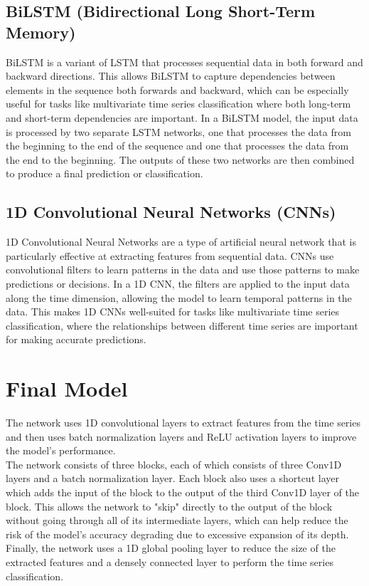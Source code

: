 \documentclass[11pt, oneside]{article}
\begin{document}
\subsection{BiLSTM (Bidirectional Long Short-Term Memory)}
BiLSTM is a variant of LSTM that processes sequential data in both forward and backward directions. This allows BiLSTM to capture dependencies between elements in the sequence both forwards and backward, which can be especially useful for tasks like multivariate time series classification where both long-term and short-term dependencies are important. In a BiLSTM model, the input data is processed by two separate LSTM networks, one that processes the data from the beginning to the end of the sequence and one that processes the data from the end to the beginning. The outputs of these two networks are then combined to produce a final prediction or classification.
\subsection{1D Convolutional Neural Networks (CNNs)}
1D Convolutional Neural Networks are a type of artificial neural network that is particularly effective at extracting features from sequential data. CNNs use convolutional filters to learn patterns in the data and use those patterns to make predictions or decisions. In a 1D CNN, the filters are applied to the input data along the time dimension, allowing the model to learn temporal patterns in the data. This makes 1D CNNs well-suited for tasks like multivariate time series classification, where the relationships between different time series are important for making accurate predictions.
\section{Final Model}
The network uses 1D convolutional layers to extract features from the time series and then uses batch normalization layers and ReLU activation layers to improve the model's performance.\\
The network consists of three blocks, each of which consists of three Conv1D layers and a batch normalization layer. Each block also uses a shortcut layer which adds the input of the block to the output of the third Conv1D layer of the block. This allows the network to "skip" directly to the output of the block without going through all of its intermediate layers, which can help reduce the risk of the model's accuracy degrading due to excessive expansion of its depth.\\
Finally, the network uses a 1D global pooling layer to reduce the size of the extracted features and a densely connected layer to perform the time series classification.
\end{document}
